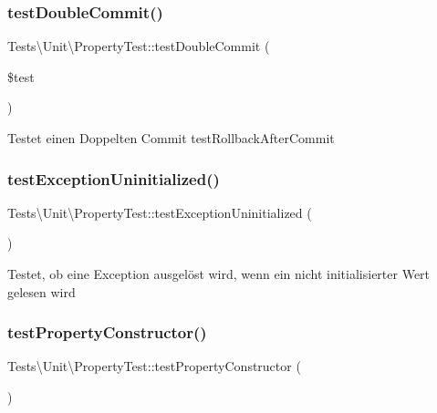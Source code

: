 \subsubsection{\texorpdfstring{test\+Double\+Commit()}{testDoubleCommit()}}
{\footnotesize\ttfamily Tests\textbackslash{}\+Unit\textbackslash{}\+Property\+Test\+::test\+Double\+Commit (\begin{DoxyParamCaption}\item[{}]{\$test }\end{DoxyParamCaption})}

Testet einen Doppelten Commit  test\+Rollback\+After\+Commit \mbox{\label{classTests_1_1Unit_1_1PropertyTest_a0836c737c012daffedb84763c5da272d}} 
\subsubsection{\texorpdfstring{test\+Exception\+Uninitialized()}{testExceptionUninitialized()}}
{\footnotesize\ttfamily Tests\textbackslash{}\+Unit\textbackslash{}\+Property\+Test\+::test\+Exception\+Uninitialized (\begin{DoxyParamCaption}{ }\end{DoxyParamCaption})}

Testet, ob eine Exception ausgelöst wird, wenn ein nicht initialisierter Wert gelesen wird   \mbox{\label{classTests_1_1Unit_1_1PropertyTest_aa96c49473a1e04265e1f1ff4a019050b}} 
\subsubsection{\texorpdfstring{test\+Property\+Constructor()}{testPropertyConstructor()}}
{\footnotesize\ttfamily Tests\textbackslash{}\+Unit\textbackslash{}\+Property\+Test\+::test\+Property\+Constructor (\begin{DoxyParamCaption}{ }\end{DoxyParamCaption})}

